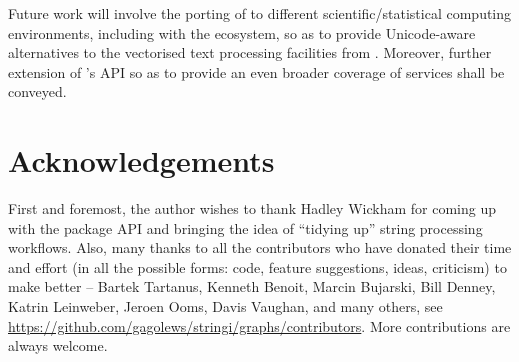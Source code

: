 \documentclass[nojss]{jss}
\begin{document}
\bigskip
Future work will involve the porting of  to different
scientific/statistical computing environments, including 
with the  ecosystem,
so as to provide Unicode-aware
alternatives to the vectorised text processing
facilities from  \cite[Chap.~7]{pandas}.
Moreover, further extension of 's API
so as to  provide an even broader coverage of  services
shall be conveyed.






\section*{Acknowledgements}

First and foremost, the author wishes to thank Hadley Wickham for coming
up with the  package API and bringing the idea of ``tidying up''
 string processing workflows.
Also, many thanks to all the contributors who have donated their
time and effort (in all the possible forms: code, feature suggestions,
ideas, criticism) to make  better --
Bartek Tartanus,
Kenneth Benoit,
Marcin Bujarski,
Bill Denney,
Katrin Leinweber,
Jeroen Ooms,
Davis Vaughan,
and many others,
see \url{https://github.com/gagolews/stringi/graphs/contributors}.
More contributions are always welcome.





\end{document}
